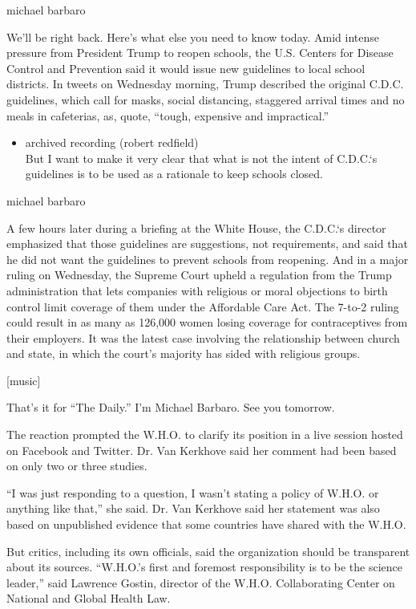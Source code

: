 michael barbaro

We'll be right back. Here's what else you need to know today. Amid
intense pressure from President Trump to reopen schools, the U.S.
Centers for Disease Control and Prevention said it would issue new
guidelines to local school districts. In tweets on Wednesday morning,
Trump described the original C.D.C. guidelines, which call for masks,
social distancing, staggered arrival times and no meals in cafeterias,
as, quote, ``tough, expensive and impractical.''

\begin{itemize}
\tightlist
\item
  archived recording (robert redfield)\\
  But I want to make it very clear that what is not the intent of
  C.D.C.`s guidelines is to be used as a rationale to keep schools
  closed.
\end{itemize}

michael barbaro

A few hours later during a briefing at the White House, the C.D.C.`s
director emphasized that those guidelines are suggestions, not
requirements, and said that he did not want the guidelines to prevent
schools from reopening. And in a major ruling on Wednesday, the Supreme
Court upheld a regulation from the Trump administration that lets
companies with religious or moral objections to birth control limit
coverage of them under the Affordable Care Act. The 7-to-2 ruling could
result in as many as 126,000 women losing coverage for contraceptives
from their employers. It was the latest case involving the relationship
between church and state, in which the court's majority has sided with
religious groups.

{[}music{]}

That's it for ``The Daily.'' I'm Michael Barbaro. See you tomorrow.

The reaction prompted the W.H.O. to clarify its position in a live
session hosted on Facebook and Twitter. Dr. Van Kerkhove said her
comment had been based on only two or three studies.

``I was just responding to a question, I wasn't stating a policy of
W.H.O. or anything like that,'' she said. Dr. Van Kerkhove said her
statement was also based on unpublished evidence that some countries
have shared with the W.H.O.

But critics, including its own officials, said the organization should
be transparent about its sources. ``W.H.O.'s first and foremost
responsibility is to be the science leader,'' said Lawrence Gostin,
director of the W.H.O. Collaborating Center on National and Global
Health Law.

